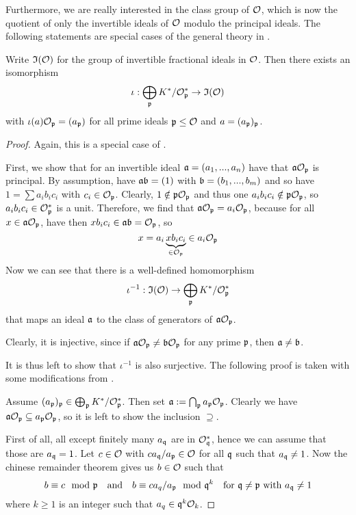 Furthermore, we are really interested in the class group of $\mathcal{O}$, which is now the quotient of only the invertible ideals of $\mathcal{O}$ modulo the principal ideals.
The following statements are special cases of the general theory in \cite[Chapter I.§12]{neukirch}.
\begin{lemma}
    \label{prop:invertible_ideal_characterization}
    Write $\mathfrak{I}(\mathcal{O})$ for the group of invertible fractional ideals in $\mathcal{O}$.
    Then there exists an isomorphism
    \begin{equation*}
        \iota: \bigoplus_{\mathfrak{p}} K^*/\mathcal{O}_{\mathfrak{p}}^* \to \mathfrak{I}(\mathcal{O})
    \end{equation*}
    with $\iota(a)\mathcal{O}_{\mathfrak{p}} = (a_{\mathfrak{p}})$ for all prime ideals $\mathfrak{p} \leq \mathcal{O}$ and $a = (a_{\mathfrak{p}})_{\mathfrak{p}}$.
\end{lemma}
\begin{proof}
    Again, this is a special case of \cite[Prop.~I.12.9]{neukirch}.

    First, we show that for an invertible ideal $\mathfrak{a} = (a_1, ..., a_n)$ have that $\mathfrak{a}\mathcal{O}_{\mathfrak{p}}$ is principal.
    By assumption, have $\mathfrak{a}\mathfrak{b} = (1)$ with $\mathfrak{b} = (b_1, ..., b_m)$ and so have $1 = \sum a_i b_i c_i$ with $c_i \in \mathcal{O}_{\mathfrak{p}}$.
    Clearly, $1 \notin \mathfrak{p}\mathcal{O}_{\mathfrak{p}}$ and thus one $a_i b_i c_i \notin \mathfrak{p}\mathcal{O}_{\mathfrak{p}}$, so $a_i b_i c_i \in \mathcal{O}_{\mathfrak{p}}^*$ is a unit.
    Therefore, we find that $\mathfrak{a}\mathcal{O}_{\mathfrak{p}} = a_i\mathcal{O}_{\mathfrak{p}}$, because for all $x \in \mathfrak{a}\mathcal{O}_{\mathfrak{p}}$, have then $x b_i c_i \in \mathfrak{a}\mathfrak{b} = \mathcal{O}_{\mathfrak{p}}$, so
    \begin{equation*}
        x = a_i \underbrace{x b_i c_i}_{\in \mathcal{O}_{\mathfrak{p}}} \in a_i \mathcal{O}_{\mathfrak{p}}
    \end{equation*}
    Now we can see that there is a well-defined homomorphism
    \begin{equation*}
        \iota^{-1}: \mathfrak{I}(\mathcal{O}) \to \bigoplus_{\mathfrak{p}} K^*/\mathcal{O}_{\mathfrak{p}}^*
    \end{equation*}
    that maps an ideal $\mathfrak{a}$ to the class of generators of $\mathfrak{a}\mathcal{O}_{\mathfrak{p}}$.
    
    Clearly, it is injective, since if $\mathfrak{a}\mathcal{O}_{\mathfrak{p}} \neq \mathfrak{b}\mathcal{O}_{\mathfrak{p}}$ for any prime $\mathfrak{p}$, then $\mathfrak{a} \neq \mathfrak{b}$.

    It is thus left to show that $\iota^{-1}$ is also surjective.
    The following proof is taken with some modifications from \cite[Prop.~I.12.2]{neukirch}.

    Assume $(a_{\mathfrak{p}})_{\mathfrak{p}} \in \bigoplus_{\mathfrak{p}} K^*/\mathcal{O}_{\mathfrak{p}}^*$.
    Then set $\mathfrak{a} := \bigcap_{\mathfrak{p}} a_{\mathfrak{p}} \mathcal{O}_{\mathfrak{p}}$.
    Clearly we have $\mathfrak{a}\mathcal{O}_{\mathfrak{p}} \subseteq a_{\mathfrak{p}}\mathcal{O}_{\mathfrak{p}}$, so it is left to show the inclusion $\supseteq$.

    First of all, all except finitely many $a_{\mathfrak{q}}$ are in $\mathcal{O}_{\mathfrak{q}}^*$, hence we can assume that those are $a_{\mathfrak{q}} = 1$.
    Let $c \in \mathcal{O}$ with $ca_{\mathfrak{q}}/a_{\mathfrak{p}} \in \mathcal{O}$ for all $\mathfrak{q}$ such that $a_{\mathfrak{q}} \neq 1$.
    Now the chinese remainder theorem gives us $b \in \mathcal{O}$ such that
    \begin{equation*}
        b \equiv c \mod {\mathfrak{p}} \quad \text{and} \quad b \equiv ca_q/a_{\mathfrak{p}} \mod {\mathfrak{q}}^k \quad \text{for $\mathfrak{q} \neq \mathfrak{p}$ with $a_{\mathfrak{q}} \neq 1$}
    \end{equation*}
    where $k \geq 1$ is an integer such that $a_q \in \mathfrak{q}^k\mathcal{O}_k$.


\end{proof}
